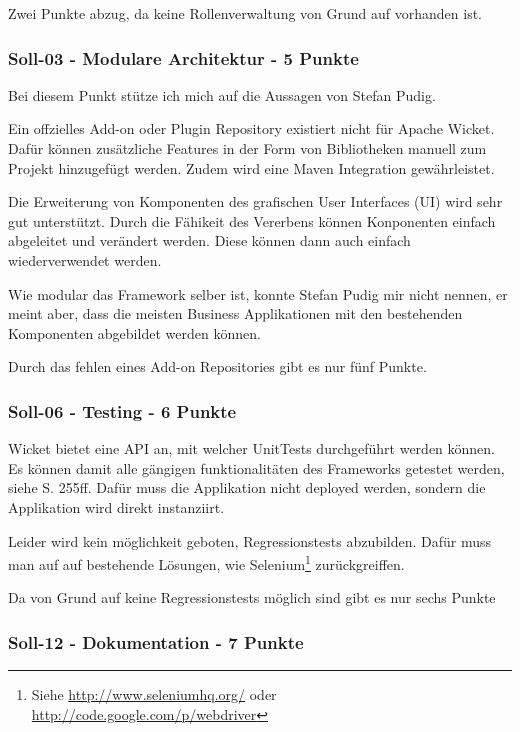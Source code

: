   \noindent
  Zwei Punkte abzug, da keine Rollenverwaltung von Grund auf vorhanden ist.
  
  \subsubsection{Soll-03 - Modulare Architektur - 5 Punkte}
  
  Bei diesem Punkt stütze ich mich auf die Aussagen von Stefan Pudig.
  
  Ein offzielles Add-on oder Plugin Repository existiert nicht für Apache
  Wicket. Dafür können zusätzliche Features in der Form von Bibliotheken manuell
  zum Projekt hinzugefügt werden. Zudem wird eine Maven Integration
  gewährleistet.
  
  Die Erweiterung von Komponenten des grafischen User Interfaces (UI) wird sehr
  gut unterstützt. Durch die Fähikeit des Vererbens können Konponenten einfach
  abgeleitet und verändert werden. Diese können dann auch einfach
  wiederverwendet werden.
  
  Wie modular das Framework selber ist, konnte Stefan Pudig mir nicht nennen, er
  meint aber, dass die meisten Business Applikationen mit den bestehenden
  Komponenten abgebildet werden können.
  
  Durch das fehlen eines Add-on Repositories gibt es nur fünf Punkte.
  
  \subsubsection{Soll-06 - Testing - 6 Punkte}
  
  Wicket bietet eine \ac{API} an, mit welcher UnitTests durchgeführt werden
  können. Es können damit alle gängigen funktionalitäten des Frameworks
  getestet werden, siehe \cite{Wicket} S. 255ff. Dafür muss die Applikation
  nicht deployed werden, sondern die Applikation wird direkt instanziirt.
  
  Leider wird kein möglichkeit geboten, Regressionstests abzubilden. Dafür muss
  man auf auf bestehende Lösungen, wie
  Selenium\footnote{Siehe \url{http://www.seleniumhq.org/} oder
  \url{http://code.google.com/p/webdriver}} zurückgreiffen.
  
  Da von Grund auf keine Regressionstests möglich sind gibt es nur sechs Punkte
  
  \subsubsection{Soll-12 - Dokumentation - 7 Punkte}

